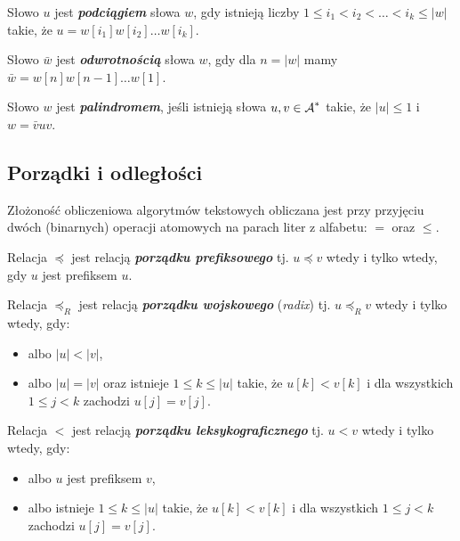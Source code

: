 \begin{definition}{}{}
  Słowo $u$ jest {\bf\textit{podciągiem}} słowa $w$, gdy istnieją liczby $1 \le i_1 < i_2 < \ldots < i_k \le |w|$ takie, że $u = w[i_1] w[i_2] \ldots w[i_k]$.
\end{definition}

\begin{definition}{}{}
  Słowo $\bar{w}$ jest {\bf\textit{odwrotnością}} słowa $w$, gdy dla $n = |w|$ mamy $\bar{w} = w[n] w[n - 1] \ldots w[1]$.
\end{definition}

\begin{definition}{}{}
  Słowo $w$ jest {\bf\textit{palindromem}}, jeśli istnieją słowa $u, v \in \operatorname{\mathcal{A}}^*$ takie, że $|u| \le 1$ i $w = \bar{v} u v$.
\end{definition}

\subsection{Porządki i odległości}

Złożoność obliczeniowa algorytmów tekstowych obliczana jest przy przyjęciu dwóch (binarnych) operacji atomowych na parach liter z alfabetu: $=$ oraz $\le$.

\begin{definition}{}{}
  Relacja $\preceq$ jest relacją {\bf\textit{porządku prefiksowego}} tj. $u \preceq v$ wtedy i tylko wtedy, gdy $u$ jest prefiksem $u$.
\end{definition}

\begin{definition}{}{}
  Relacja $\preceq_R$ jest relacją {\bf\textit{porządku wojskowego}} (\emph{radix}) tj. $u \preceq_R v$ wtedy i tylko wtedy, gdy:
  \begin{itemize}
    \item albo $|u| < |v|$,
    \item albo $|u| = |v|$ oraz istnieje $1 \le k \le |u|$ takie, że $u[k] < v[k]$ i dla wszystkich $1 \le j < k$ zachodzi $u[j] = v[j]$.
  \end{itemize}
\end{definition}

\begin{definition}{}{}
  Relacja $<$ jest relacją {\bf\textit{porządku leksykograficznego}} tj. $u < v$ wtedy i tylko wtedy, gdy:
  \begin{itemize}
    \item albo $u$ jest prefiksem $v$,
    \item albo istnieje $1 \le k \le |u|$ takie, że $u[k] < v[k]$ i dla wszystkich $1 \le j < k$ zachodzi $u[j] = v[j]$.
  \end{itemize}
\end{definition}


